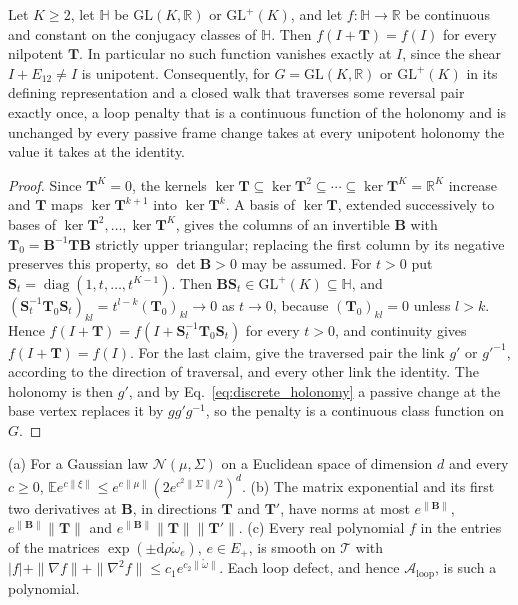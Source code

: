 \begin{proposition}\label{prop:llp_class_function}
Let $K\geq2$, let $\mathbb H$ be $\mathrm{GL}(K,\mathbb R)$ or $\mathrm{GL}^+(K)$, and let $f:\mathbb H\to\mathbb R$ be continuous and constant on the conjugacy classes of $\mathbb H$. Then $f(I+\mathbf T)=f(I)$ for every nilpotent $\mathbf T$. In particular no such function vanishes exactly at $I$, since the shear $I+E_{12}\neq I$ is unipotent. Consequently, for $G=\mathrm{GL}(K,\mathbb R)$ or $\mathrm{GL}^+(K)$ in its defining representation and a closed walk that traverses some reversal pair exactly once, a loop penalty that is a continuous function of the holonomy and is unchanged by every passive frame change takes at every unipotent holonomy the value it takes at the identity.
\end{proposition}

\begin{proof}
Since $\mathbf T^K=0$, the kernels $\ker\mathbf T\subseteq\ker\mathbf T^2\subseteq\cdots\subseteq\ker\mathbf T^K=\mathbb R^K$ increase and $\mathbf T$ maps $\ker\mathbf T^{k+1}$ into $\ker\mathbf T^k$. A basis of $\ker\mathbf T$, extended successively to bases of $\ker\mathbf T^2,\ldots,\ker\mathbf T^K$, gives the columns of an invertible $\mathbf B$ with $\mathbf T_0=\mathbf B^{-1}\mathbf T\mathbf B$ strictly upper triangular; replacing the first column by its negative preserves this property, so $\det\mathbf B>0$ may be assumed. For $t>0$ put $\mathbf S_t=\operatorname{diag}(1,t,\ldots,t^{K-1})$. Then $\mathbf B\mathbf S_t\in\mathrm{GL}^+(K)\subseteq\mathbb H$, and $(\mathbf S_t^{-1}\mathbf T_0\mathbf S_t)_{kl}=t^{l-k}(\mathbf T_0)_{kl}\to0$ as $t\to0$, because $(\mathbf T_0)_{kl}=0$ unless $l>k$. Hence $f(I+\mathbf T)=f(I+\mathbf S_t^{-1}\mathbf T_0\mathbf S_t)$ for every $t>0$, and continuity gives $f(I+\mathbf T)=f(I)$. For the last claim, give the traversed pair the link $g'$ or $g'^{-1}$, according to the direction of traversal, and every other link the identity. The holonomy is then $g'$, and by Eq.~\eqref{eq:discrete_holonomy} a passive change at the base vertex replaces it by $gg'g^{-1}$, so the penalty is a continuous class function on $G$.
\end{proof}

\begin{lemma}\label{lem:llp_growth}
(a) For a Gaussian law $\mathcal N(\mu,\Sigma)$ on a Euclidean space of dimension $d$ and every $c\geq0$, $\mathbb Ee^{c\|\xi\|}\leq e^{c\|\mu\|}(2e^{c^2\|\Sigma\|/2})^d$.
(b) The matrix exponential and its first two derivatives at $\mathbf B$, in directions $\mathbf T$ and $\mathbf T'$, have norms at most $e^{\|\mathbf B\|}$, $e^{\|\mathbf B\|}\|\mathbf T\|$ and $e^{\|\mathbf B\|}\|\mathbf T\|\|\mathbf T'\|$.
(c) Every real polynomial $f$ in the entries of the matrices $\exp(\pm\mathrm d\rho\mathring\omega_e)$, $e\in E_+$, is smooth on $\mathcal T$ with $|f|+\|\nabla f\|+\|\nabla^2f\|\leq c_1e^{c_2\|\mathring\omega\|}$. Each loop defect, and hence $\mathcal A_{\mathrm{loop}}$, is such a polynomial.
\end{lemma}

